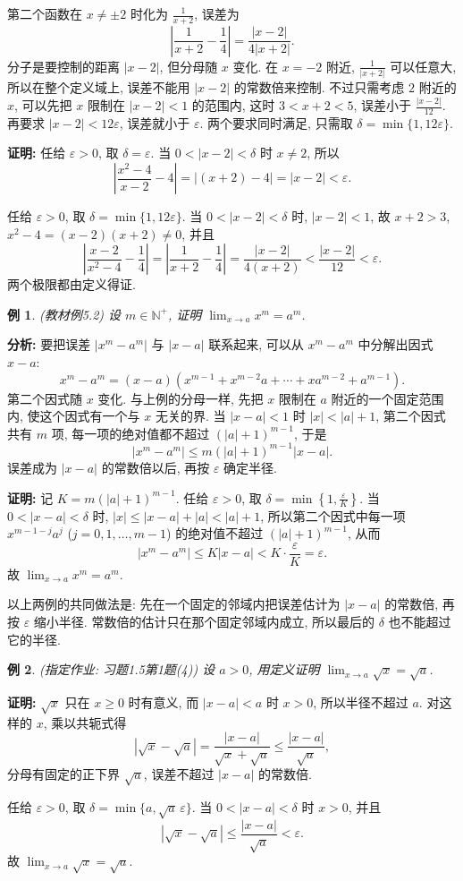 \documentclass[UTF8,openany]{ctexbook}
\theoremstyle{chinesetextbook}
\newtheorem{example}{例}[section]
\newenvironment{cnproof}{\par\indent\textbf{证明:} \ignorespaces}{\par}
\begin{document}
第二个函数在 $x\ne\pm2$ 时化为 $\displaystyle\frac1{x+2}$, 误差为
\[
\left|\frac1{x+2}-\frac14\right|=\frac{|x-2|}{4|x+2|}.
\]
分子是要控制的距离 $|x-2|$, 但分母随 $x$ 变化. 在 $x=-2$ 附近, $\displaystyle\frac1{|x+2|}$ 可以任意大, 所以在整个定义域上, 误差不能用 $|x-2|$ 的常数倍来控制. 不过只需考虑 $2$ 附近的 $x$, 可以先把 $x$ 限制在 $|x-2|<1$ 的范围内, 这时 $3<x+2<5$, 误差小于 $\displaystyle\frac{|x-2|}{12}$. 再要求 $|x-2|<12\varepsilon$, 误差就小于 $\varepsilon$. 两个要求同时满足, 只需取 $\delta=\min\{1,12\varepsilon\}$.
\begin{cnproof}
任给 $\varepsilon>0$, 取 $\delta=\varepsilon$. 当 $0<|x-2|<\delta$ 时 $x\ne2$, 所以
\[
\left|\frac{x^2-4}{x-2}-4\right|=|(x+2)-4|=|x-2|<\varepsilon.
\]

任给 $\varepsilon>0$, 取 $\delta=\min\{1,12\varepsilon\}$. 当 $0<|x-2|<\delta$ 时, $|x-2|<1$, 故 $x+2>3$, $x^2-4=(x-2)(x+2)\ne0$, 并且
\[
\left|\frac{x-2}{x^2-4}-\frac14\right|=\left|\frac1{x+2}-\frac14\right|=\frac{|x-2|}{4(x+2)}<\frac{|x-2|}{12}<\varepsilon.
\]
两个极限都由定义得证.
\end{cnproof}
\begin{example}
\textnormal{(教材例5.2)} 设 $m\in\mathbb N^+$, 证明 $\displaystyle\lim_{x\to a}x^m=a^m$.
\end{example}
\par\indent\textbf{分析:} 要把误差 $|x^m-a^m|$ 与 $|x-a|$ 联系起来, 可以从 $x^m-a^m$ 中分解出因式 $x-a$:
\[
x^m-a^m=(x-a)\left(x^{m-1}+x^{m-2}a+\cdots+xa^{m-2}+a^{m-1}\right).
\]
第二个因式随 $x$ 变化. 与上例的分母一样, 先把 $x$ 限制在 $a$ 附近的一个固定范围内, 使这个因式有一个与 $x$ 无关的界. 当 $|x-a|<1$ 时 $|x|<|a|+1$, 第二个因式共有 $m$ 项, 每一项的绝对值都不超过 $(|a|+1)^{m-1}$, 于是
\[
|x^m-a^m|\le m(|a|+1)^{m-1}|x-a|.
\]
误差成为 $|x-a|$ 的常数倍以后, 再按 $\varepsilon$ 确定半径.
\begin{cnproof}
记 $K=m(|a|+1)^{m-1}$. 任给 $\varepsilon>0$, 取 $\displaystyle\delta=\min\left\{1,\frac\varepsilon K\right\}$. 当 $0<|x-a|<\delta$ 时, $|x|\le|x-a|+|a|<|a|+1$, 所以第二个因式中每一项 $x^{m-1-j}a^j$ ($j=0,1,\ldots,m-1$) 的绝对值不超过 $(|a|+1)^{m-1}$, 从而
\[
|x^m-a^m|\le K|x-a|<K\cdot\frac\varepsilon K=\varepsilon.
\]
故 $\displaystyle\lim_{x\to a}x^m=a^m$.
\end{cnproof}
以上两例的共同做法是: 先在一个固定的邻域内把误差估计为 $|x-a|$ 的常数倍, 再按 $\varepsilon$ 缩小半径. 常数倍的估计只在那个固定邻域内成立, 所以最后的 $\delta$ 也不能超过它的半径.
\begin{example}
\textnormal{(指定作业: 习题1.5第1题(4))} 设 $a>0$, 用定义证明 $\displaystyle\lim_{x\to a}\sqrt x=\sqrt a$.
\end{example}
\begin{cnproof}
$\sqrt x$ 只在 $x\ge0$ 时有意义, 而 $|x-a|<a$ 时 $x>0$, 所以半径不超过 $a$. 对这样的 $x$, 乘以共轭式得
\[
|\sqrt x-\sqrt a|=\frac{|x-a|}{\sqrt x+\sqrt a}\le\frac{|x-a|}{\sqrt a},
\]
分母有固定的正下界 $\sqrt a$, 误差不超过 $|x-a|$ 的常数倍.

任给 $\varepsilon>0$, 取 $\delta=\min\{a,\sqrt a\,\varepsilon\}$. 当 $0<|x-a|<\delta$ 时 $x>0$, 并且
\[
|\sqrt x-\sqrt a|\le\frac{|x-a|}{\sqrt a}<\varepsilon.
\]
故 $\displaystyle\lim_{x\to a}\sqrt x=\sqrt a$.
\end{cnproof}
\end{document}
